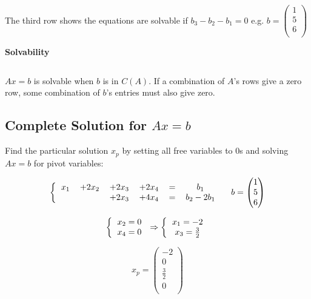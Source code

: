 \documentclass[12pt]{article}
\begin{document}
The third row shows the equations are solvable if $b_3 - b_2 - b_1 = 0$ e.g.  
$b=
\left(
    \begin{matrix}
        1\\
        5\\
        6\\
    \end{matrix}
\right)
$

\textbf{Solvability}

$\>$

$Ax=b$ is solvable when $b$ is in $C(A)$. If a combination of $A$'s rows give a zero row, some combination of $b$'s entries must also give zero.

\subsection{Complete Solution for $Ax=b$}

Find the particular solution $x_p$ by setting all free variables to 0s and solving $Ax=b$ for pivot variables:

\[
\left \{
  \begin{tabular}{cccccc}
  $x_1$ & $+2x_2$ & $+2x_3$ & $+2x_4$ & $=$ & $b_1$\\
  & & $+2x_3$ & $+4x_4$ & $=$ & $b_2-2b_1$\\
  \end{tabular}
\right
.\quad
b=
\left(
    \begin{matrix}
        1\\
        5\\
        6\\
    \end{matrix}
\right)
\]

\[
\left \{
  \begin{tabular}{c}
  $x_2=0$\\
  $x_4=0$\\
  \end{tabular}
\right
.\Rightarrow
\left \{
  \begin{tabular}{c}
  $x_1=-2$\\
  $x_3=\frac{3}{2}$\\
  \end{tabular}
\right
.\]

\[
x_p=
\left(
    \begin{matrix}
        -2\\
        0\\
        \frac{3}{2}\\
        0\\
    \end{matrix}
\right)
\]
\end{document}
